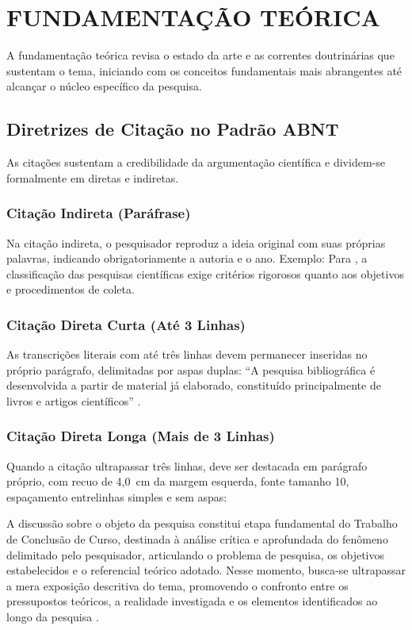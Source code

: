 \documentclass[
    12pt,               %
    openright,          %
    oneside,            %
    a4paper,            %
    english,            %
    brazil              %
]{abntex2}
\begin{document}
\chapter{FUNDAMENTAÇÃO TEÓRICA}
\label{cap:fundamentacao}

A fundamentação teórica revisa o estado da arte e as correntes doutrinárias que sustentam o tema, iniciando com os conceitos fundamentais mais abrangentes até alcançar o núcleo específico da pesquisa.

\section{Diretrizes de Citação no Padrão ABNT}
As citações sustentam a credibilidade da argumentação científica e dividem-se formalmente em diretas e indiretas.

\subsection{Citação Indireta (Paráfrase)}
Na citação indireta, o pesquisador reproduz a ideia original com suas próprias palavras, indicando obrigatoriamente a autoria e o ano. Exemplo: Para , a classificação das pesquisas científicas exige critérios rigorosos quanto aos objetivos e procedimentos de coleta.

\subsection{Citação Direta Curta (Até 3 Linhas)}
As transcrições literais com até três linhas devem permanecer inseridas no próprio parágrafo, delimitadas por aspas duplas: ``A pesquisa bibliográfica é desenvolvida a partir de material já elaborado, constituído principalmente de livros e artigos científicos'' \cite[p.~44]{gil2002metodos}.

\subsection{Citação Direta Longa (Mais de 3 Linhas)}
Quando a citação ultrapassar três linhas, deve ser destacada em parágrafo próprio, com recuo de 4,0~cm da margem esquerda, fonte tamanho 10, espaçamento entrelinhas simples e sem aspas:

\begin{citacao}
A discussão sobre o objeto da pesquisa constitui etapa fundamental do Trabalho de Conclusão de Curso, destinada à análise crítica e aprofundada do fenômeno delimitado pelo pesquisador, articulando o problema de pesquisa, os objetivos estabelecidos e o referencial teórico adotado. Nesse momento, busca-se ultrapassar a mera exposição descritiva do tema, promovendo o confronto entre os pressupostos teóricos, a realidade investigada e os elementos identificados ao longo da pesquisa \cite[p.~12]{modeloUnivassouras2026}.
\end{citacao}
\end{document}
